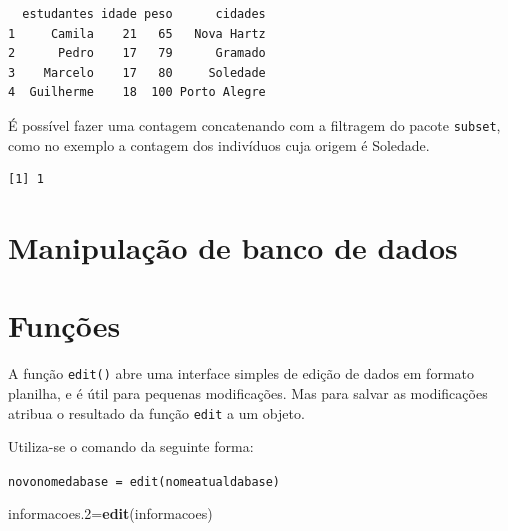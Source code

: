 \documentclass[12pt,brazil,oneside]{book}
\newenvironment{Shaded}{\begin{snugshade}}{\end{snugshade}}
\newcommand{\FloatTok}[1]{\textcolor[rgb]{0.00,0.00,0.81}{#1}}
\newcommand{\KeywordTok}[1]{\textcolor[rgb]{0.13,0.29,0.53}{\textbf{#1}}}
\newcommand{\NormalTok}[1]{#1}
\newcommand{\OperatorTok}[1]{\textcolor[rgb]{0.81,0.36,0.00}{\textbf{#1}}}
\newcommand{\StringTok}[1]{\textcolor[rgb]{0.31,0.60,0.02}{#1}}
\begin{document}
\begin{verbatim}
  estudantes idade peso      cidades
1     Camila    21   65   Nova Hartz
2      Pedro    17   79      Gramado
3    Marcelo    17   80     Soledade
4  Guilherme    18  100 Porto Alegre
\end{verbatim}

É possível fazer uma contagem concatenando com a filtragem do pacote
\texttt{subset}, como no exemplo a contagem dos indivíduos cuja origem é
Soledade.

\begin{Shaded}
\end{Shaded}

\begin{verbatim}
[1] 1
\end{verbatim}

\hypertarget{manipulacao-de-banco-de-dados}{%
\section{Manipulação de banco de
dados}\label{manipulacao-de-banco-de-dados}}

\hypertarget{funcoes}{%
\section{Funções}\label{funcoes}}

A função \texttt{edit()} abre uma interface simples de edição de dados
em formato planilha, e é útil para pequenas modificações. Mas para
salvar as modificações atribua o resultado da função \texttt{edit} a um
objeto.

Utiliza-se o comando da seguinte forma:

\texttt{novonomedabase\ =\ edit(nomeatualdabase)}

\begin{Shaded}
\begin{Highlighting}[]
\NormalTok{informacoes}\FloatTok{.2}\NormalTok{=}\KeywordTok{edit}\NormalTok{(informacoes)}
\end{Highlighting}
\end{Shaded}
\end{document}
